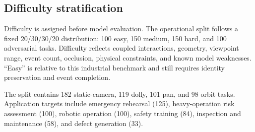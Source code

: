 \subsection{Difficulty stratification}

Difficulty is assigned before model evaluation. The operational split follows a fixed 20/30/30/20 distribution: 100 easy, 150 medium, 150 hard, and 100 adversarial tasks. Difficulty reflects coupled interactions, geometry, viewpoint range, event count, occlusion, physical constraints, and known model weaknesses. ``Easy'' is relative to this industrial benchmark and still requires identity preservation and event completion.

The split contains 182 static-camera, 119 dolly, 101 pan, and 98 orbit tasks. Application targets include emergency rehearsal (125), heavy-operation risk assessment (100), robotic operation (100), safety training (84), inspection and maintenance (58), and defect generation (33).
